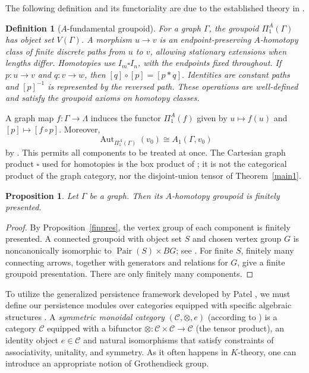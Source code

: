 \documentclass{amsart}
\newtheorem{proposition}[theorem]{Proposition}
\newtheorem{definition}[theorem]{Definition}
\begin{document}
The following definition and its functoriality are due to the established theory in \cite[Definition~3.4]{kapulkin_grupoid}.

\begin{definition}[$A$-fundamental groupoid]\label{def:agroupoid}
For a graph $\Gamma$, the groupoid $\Pi_1^A(\Gamma)$ has object set $V(\Gamma)$. A morphism $u\to v$ is an endpoint-preserving $A$-homotopy class of finite discrete paths from $u$ to $v$, allowing stationary extensions when lengths differ. Homotopies use $I_m\square I_n$, with the endpoints fixed throughout. If $p:u\to v$ and $q:v\to w$, then $[q]\circ[p]=[p*q]$. Identities are constant paths and $[p]^{-1}$ is represented by the reversed path. These operations are well-defined and satisfy the groupoid axioms on homotopy classes.
\end{definition}

A graph map $f:\Gamma\to\Lambda$ induces the functor $\Pi_1^A(f)$ given by $u\mapsto f(u)$ and $[p]\mapsto[f\circ p]$. Moreover,
\[
\operatorname{Aut}_{\Pi_1^A(\Gamma)}(v_0)\cong A_1(\Gamma,v_0)
\]
by \cite[Proposition~3.5]{kapulkin_grupoid}. This permits all components to be treated at once. The Cartesian graph product $\square$ used for homotopies is the box product of \cite[Definition~1.6]{kapulkin_grupoid}; it is not the categorical product of the graph category, nor the disjoint-union tensor of Theorem~\ref{main1}.

\begin{proposition}
  Let $\Gamma$ be a graph. Then its $A$-homotopy groupoid is finitely presented.  
\end{proposition}

\begin{proof}
    By Proposition~\ref{finpres}, the vertex group of each component is finitely presented. A connected groupoid with object set $S$ and chosen vertex group $G$ is noncanonically isomorphic to $\operatorname{Pair}(S)\times BG$; see \cite[Section~1.7, equation~(1.7.1), p.~26]{ronbrown2}. For finite $S$, finitely many connecting arrows, together with generators and relations for $G$, give a finite groupoid presentation. There are only finitely many components.
\end{proof}




To utilize the generalized persistence framework developed by  Patel \cite{patel2016generalized}, we must define our persistence modules over categories equipped with specific algebraic structures \cite{maclane1998categories}. A \textit{symmetric monoidal category}  $(\mathcal{C}, \otimes, e)$ (according to \cite[Sections~VII.1 and XI.1]{maclane1998categories}) is a category $\mathcal{C}$ equipped with a bifunctor $\otimes \colon \mathcal{C} \times \mathcal{C} \to \mathcal{C}$ (the tensor product), an identity object $e \in \mathcal{C}$ and natural isomorphisms that satisfy constraints of associativity, unitality, and symmetry. As it often happens in $K$-theory, one can introduce an appropriate notion of Grothendieck group. 
\end{document}
